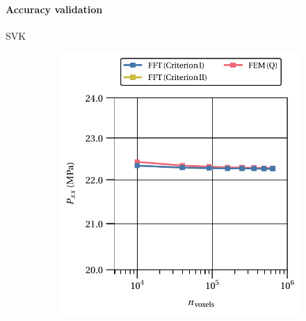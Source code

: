 \paragraph{Accuracy validation}

SVK

\begin{figure}[hbt]
\centering
	\begin{subfigure}[b]{0.49\textwidth}
    \centering
    \includegraphics[width=\textwidth]{figures/svk_2D_normal_homo_stress_11_vs_n_voxels}
    \caption{}
    \label{subfig:svk_2D_normal_homo_stress_11_vs_n_voxels}
  \end{subfigure}
  \begin{subfigure}[b]{0.49\textwidth}
    \centering

\end{subfigure}
\end{figure}
